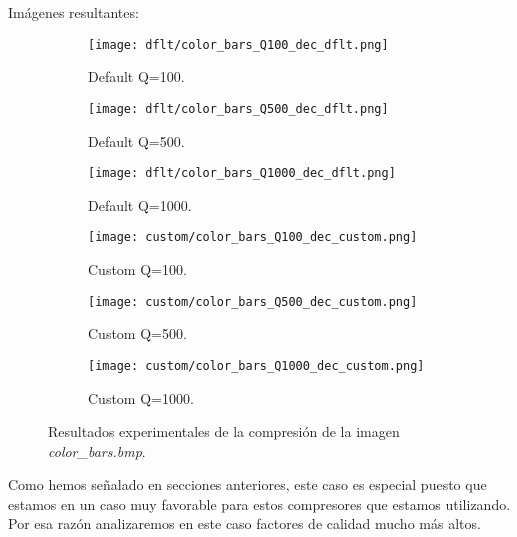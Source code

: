 \documentclass[12pt,a4paper]{article}
\begin{document}
Imágenes resultantes:
\begin{figure}   [H]
    \begin{subfigure}{0.30\textwidth}
        \centering
        \texttt{[image: dflt/color\_bars\_Q100\_dec\_dflt.png]}
        \caption{Default Q=100.}
        
    \end{subfigure}
    \hfill
    \begin{subfigure}{0.30\textwidth}
        \centering
        \texttt{[image: dflt/color\_bars\_Q500\_dec\_dflt.png]}
        \caption{Default Q=500.}
        
    \end{subfigure}
    \hfill
    \begin{subfigure}{0.30\textwidth}
        \centering
        \texttt{[image: dflt/color\_bars\_Q1000\_dec\_dflt.png]}
        \caption{Default Q=1000.}
        
    \end{subfigure}
    
    \vspace{0.5cm}
    
    \begin{subfigure}{0.30\textwidth}
        \centering
        \texttt{[image: custom/color\_bars\_Q100\_dec\_custom.png]}
        \caption{Custom Q=100.}
        
    \end{subfigure}
    \hfill
    \begin{subfigure}{0.30\textwidth}
        \centering
        \texttt{[image: custom/color\_bars\_Q500\_dec\_custom.png]}
        \caption{Custom Q=500.}
        
    \end{subfigure}
    \hfill
    \begin{subfigure}{0.30\textwidth}
        \centering
        \texttt{[image: custom/color\_bars\_Q1000\_dec\_custom.png]}
        \caption{Custom Q=1000.}
        
    \end{subfigure}
    
    \caption[Resultados experimentales - color\_bars]{Resultados experimentales de la compresión de la imagen \textit{color\_bars.bmp}.}
    
\end{figure}

Como hemos señalado en secciones anteriores, este caso es especial puesto que estamos en un caso muy favorable para estos compresores que estamos utilizando. Por esa razón analizaremos en este caso factores de calidad mucho más altos.\\
\end{document}
